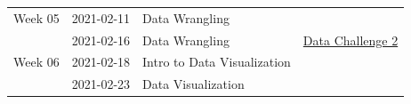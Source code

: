 \documentclass[
]{book}
\begin{document}
\begin{longtable}[]{@{}llll@{}}
\begin{minipage}[t]{0.22\columnwidth}\raggedright
Week 05\strut
\end{minipage} & \begin{minipage}[t]{0.22\columnwidth}\raggedright
2021-02-11\strut
\end{minipage} & \begin{minipage}[t]{0.22\columnwidth}\raggedright
Data Wrangling\strut
\end{minipage} & \begin{minipage}[t]{0.22\columnwidth}\raggedright
\strut
\end{minipage}\tabularnewline
\begin{minipage}[t]{0.22\columnwidth}\raggedright
\strut
\end{minipage} & \begin{minipage}[t]{0.22\columnwidth}\raggedright
2021-02-16\strut
\end{minipage} & \begin{minipage}[t]{0.22\columnwidth}\raggedright
Data Wrangling\strut
\end{minipage} & \begin{minipage}[t]{0.22\columnwidth}\raggedright
\href{https://classroom.github.com/a/h4Hgow-M}{Data Challenge 2}\strut
\end{minipage}\tabularnewline
\begin{minipage}[t]{0.22\columnwidth}\raggedright
Week 06\strut
\end{minipage} & \begin{minipage}[t]{0.22\columnwidth}\raggedright
2021-02-18\strut
\end{minipage} & \begin{minipage}[t]{0.22\columnwidth}\raggedright
Intro to Data Visualization\strut
\end{minipage} & \begin{minipage}[t]{0.22\columnwidth}\raggedright
\strut
\end{minipage}\tabularnewline
\begin{minipage}[t]{0.22\columnwidth}\raggedright
\strut
\end{minipage} & \begin{minipage}[t]{0.22\columnwidth}\raggedright
2021-02-23\strut
\end{minipage} & \begin{minipage}[t]{0.22\columnwidth}\raggedright
Data Visualization\strut
\end{minipage} & \begin{minipage}[t]{0.22\columnwidth}\raggedright

\end{minipage}
\end{longtable}
\end{document}
